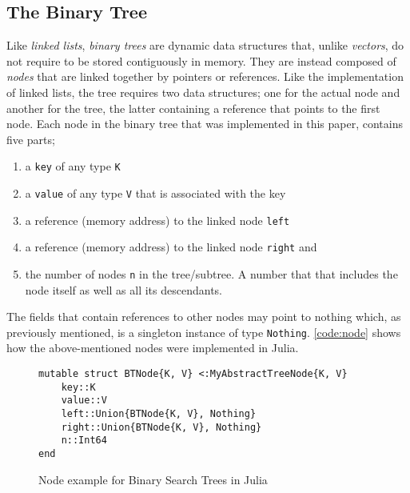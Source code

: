 \documentclass[a4paper, 11pt]{article}
\begin{document}
    \subsection*{The Binary Tree}
    Like \emph{linked lists}, \emph{binary trees} are dynamic data structures that, unlike \emph{vectors}, 
    do not require to be stored contiguously in memory. They are instead composed of \emph{nodes} 
    that are linked together by pointers or references. 
    Like the implementation of linked lists, the tree requires two data structures; one
    for the actual node and another for the tree, the latter containing a
    reference that points to the first node. 
    Each node in the binary tree that was implemented in this paper, contains five parts;
    \begin{enumerate}[itemsep=1pt]
        \item a \texttt{key} of any type \texttt{K}
        \item a \texttt{value} of any type \texttt{V} 
        that is associated with the key
        \item a reference (memory address) to the linked node \texttt{left}
        \item a reference (memory address) to the linked node \texttt{right} and
        \item the number of nodes \texttt{n} in the tree/subtree. 
        A number that that includes the node itself as well as all its descendants.
    \end{enumerate}

    The fields that contain references to other nodes may point to nothing 
    which, as previously mentioned, is a singleton instance of type \texttt{Nothing}.
    \autoref{code:node} shows how the above-mentioned nodes were implemented in Julia. 
    \begin{figure}[H]
        \centering
    \begin{verbatim}
mutable struct BTNode{K, V} <:MyAbstractTreeNode{K, V} 
    key::K
    value::V
    left::Union{BTNode{K, V}, Nothing}
    right::Union{BTNode{K, V}, Nothing}
    n::Int64 
end
    \end{verbatim}
    \caption{Node example for Binary Search Trees in Julia}
    \label{code:node}
    \end{figure}
\end{document}

